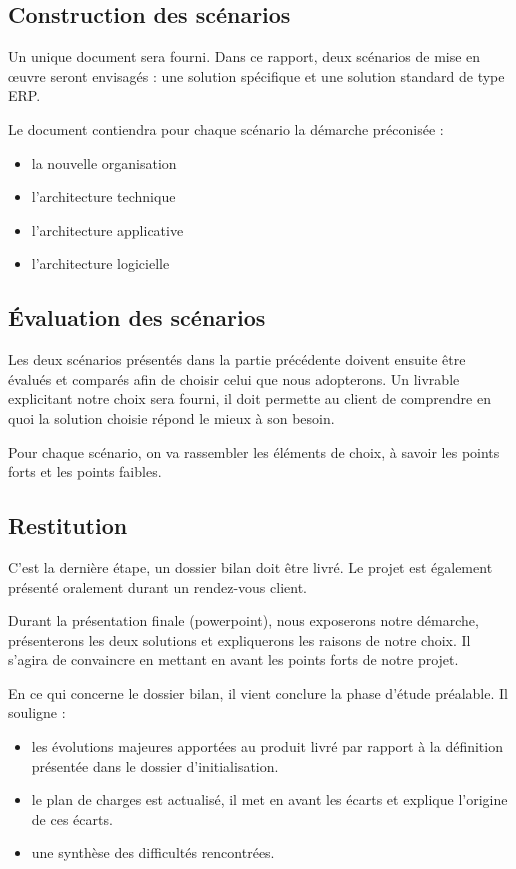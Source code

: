 \subsection{Construction des scénarios}

Un unique document sera fourni. Dans ce rapport, deux scénarios de mise en œuvre seront envisagés : une solution spécifique et une solution standard de type ERP.

Le document contiendra pour chaque scénario la démarche préconisée :
\begin{itemize}
    \item la nouvelle organisation
    \item l’architecture technique
    \item l’architecture applicative
    \item l’architecture logicielle
\end{itemize}
\subsection{Évaluation des scénarios}

Les deux scénarios présentés dans la partie précédente doivent ensuite être évalués et comparés afin de choisir celui que nous adopterons. Un livrable explicitant notre choix sera fourni, il doit permette au client de comprendre en quoi la solution choisie répond le mieux à son besoin.

Pour chaque scénario, on va rassembler les éléments de choix, à savoir les points forts et les points faibles.


\subsection{Restitution}

C’est la dernière étape, un dossier bilan doit être livré. Le projet est également présenté oralement durant un rendez-vous client.

Durant la présentation finale (powerpoint), nous exposerons notre démarche, présenterons les deux solutions et expliquerons les raisons de notre choix. Il s’agira de convaincre en mettant en avant les points forts de notre projet.

En ce qui concerne le dossier bilan, il vient conclure la phase d’étude préalable. Il souligne :
\begin{itemize}
    \item les évolutions majeures apportées au produit livré par rapport à la définition présentée dans le dossier d’initialisation.
    \item le plan de charges est actualisé, il met en avant les écarts et explique l’origine de ces écarts.
    \item une  synthèse des difficultés rencontrées.
\end{itemize}

